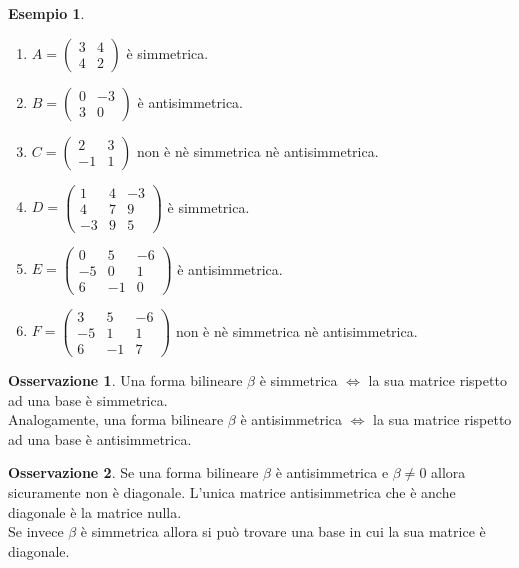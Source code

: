 \documentclass[a4paper]{article}
\theoremstyle{definition}
\newtheorem*{oss}{Osservazione}
\newtheorem*{es}{Esempio}
\begin{document}
	\begin{es}
		\begin{enumerate}
			\item $A = \begin{pmatrix}
				3 & 4 \\
				4 & 2
			\end{pmatrix}$ è simmetrica.
			\item $B = \begin{pmatrix}
				0 & -3 \\
				3 & 0
			\end{pmatrix}$ è antisimmetrica.
			\item $C = \begin{pmatrix}
				2 & 3 \\
				-1 & 1
			\end{pmatrix}$ non è nè simmetrica nè antisimmetrica.
			\item $D = \begin{pmatrix}
				1 & 4 & -3 \\
				4 & 7 & 9 \\
				-3 & 9 & 5
			\end{pmatrix}$ è simmetrica.
			\item $E = \begin{pmatrix}
				0 & 5 & -6 \\
				-5 & 0 & 1 \\
				6 & -1 & 0
			\end{pmatrix}$ è antisimmetrica.
			\item $F = \begin{pmatrix}
				3 & 5 & -6 \\
				-5 & 1 & 1 \\
				6 & -1 & 7
			\end{pmatrix}$ non è nè simmetrica nè antisimmetrica.
		\end{enumerate}
	\end{es}
	\begin{oss}
		Una forma bilineare $\beta$ è simmetrica $\Leftrightarrow$ la sua matrice rispetto ad una base è simmetrica. \\
		Analogamente, una forma bilineare $\beta$ è antisimmetrica $\Leftrightarrow$ la sua matrice rispetto ad una base è antisimmetrica.
	\end{oss}

	\begin{oss}
		Se una forma bilineare $\beta$ è antisimmetrica e $\beta \ne 0$ allora sicuramente non è diagonale. L'unica matrice antisimmetrica che è anche diagonale è la matrice nulla. \\
		Se invece $\beta$ è simmetrica allora si può trovare una base in cui la sua matrice è diagonale.
	\end{oss}
\end{document}
